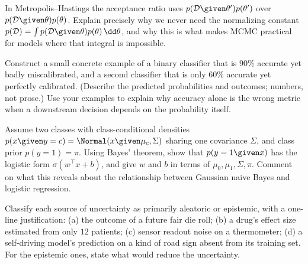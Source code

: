\begin{exercise}
In Metropolis--Hastings the acceptance ratio uses
$p(\mathcal{D}\given\theta')p(\theta')$ over
$p(\mathcal{D}\given\theta)p(\theta)$. Explain precisely why we never need the
normalizing constant
$p(\mathcal{D}) = \int p(\mathcal{D}\given\theta)p(\theta)\,\dd\theta$,
and why this is what makes MCMC practical for models where that integral is
impossible.
\end{exercise}

\begin{exercise}
Construct a small concrete example of a binary classifier that is $90\%$ accurate
yet badly miscalibrated, and a second classifier that is only $60\%$ accurate yet
perfectly calibrated. (Describe the predicted probabilities and outcomes; numbers,
not prose.) Use your examples to explain why accuracy alone is the wrong metric
when a downstream decision depends on the probability itself.
\end{exercise}

\begin{exercise}
Assume two classes with class-conditional densities
$p(x\given y=c) = \Normal(x\given\mu_c,\Sigma)$ sharing one covariance $\Sigma$,
and class prior $p(y=1)=\pi$. Using Bayes' theorem, show that $p(y=1\given x)$ has
the logistic form $\sigma(w^\top x + b)$, and give $w$ and $b$ in terms of
$\mu_0,\mu_1,\Sigma,\pi$. Comment on what this reveals about the relationship
between Gaussian naive Bayes and logistic regression.
\end{exercise}

\begin{exercise}
Classify each source of uncertainty as primarily aleatoric or epistemic, with a
one-line justification: (a) the outcome of a future fair die roll; (b) a drug's
effect size estimated from only $12$ patients; (c) sensor readout noise on a
thermometer; (d) a self-driving model's prediction on a kind of road sign absent
from its training set. For the epistemic ones, state what would reduce the
uncertainty.
\end{exercise}
